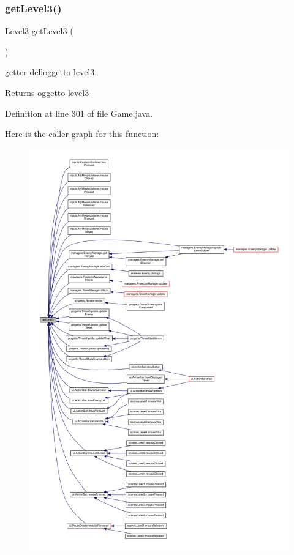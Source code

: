 \subsubsection{\texorpdfstring{get\+Level3()}{getLevel3()}}
{\footnotesize\ttfamily \hyperlink{classscenes_1_1_level3}{Level3} get\+Level3 (\begin{DoxyParamCaption}{ }\end{DoxyParamCaption})}



getter dell\textquotesingle{}oggetto level3. 

\begin{DoxyReturn}{Returns}
oggetto level3 
\end{DoxyReturn}


Definition at line 301 of file Game.\+java.

Here is the caller graph for this function\+:\nopagebreak
\begin{figure}[H]
\begin{center}
\leavevmode
\includegraphics[width=350pt]{classprogetto_1_1_game_a0869f04fd1631b5ad909e51c85e9e57b_icgraph}
\end{center}
\end{figure}
\mbox{\label{classprogetto_1_1_game_a09e02ae6992f3328be34c9062ef142f8}} 
